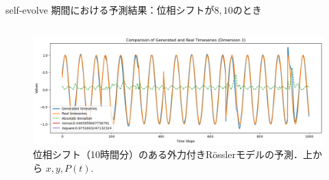 \begin{frame}{self-evolve 期間における予測結果：位相シフトが$8, 10$のとき}
\begin{columns}[T]
\begin{column}{.5\textwidth}
\begin{figure}
        \vspace{.5em}
        \begin{minipage}[c][.27\textheight][c]{\linewidth}
          \centering
          \includegraphics[width=0.7\linewidth]{Fig/10.p.png}
          \caption{\scriptsize{位相シフト（10時間分）のある外力付きRösslerモデルの予測．上から $x, y, P(t)$.}}
        \end{minipage}
      \end{figure}
    \end{column}
  \end{columns}
\end{frame}

